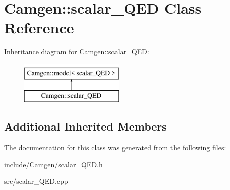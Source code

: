 \hypertarget{a00487}{\section{Camgen\-:\-:scalar\-\_\-\-Q\-E\-D Class Reference}
\label{a00487}
}
Inheritance diagram for Camgen\-:\-:scalar\-\_\-\-Q\-E\-D\-:\begin{figure}[H]
\begin{center}
\leavevmode
\includegraphics[height=2.000000cm]{a00487}
\end{center}
\end{figure}
\subsection*{Additional Inherited Members}


The documentation for this class was generated from the following files\-:\begin{DoxyCompactItemize}
\item 
include/\-Camgen/scalar\-\_\-\-Q\-E\-D.\-h\item 
src/scalar\-\_\-\-Q\-E\-D.\-cpp\end{DoxyCompactItemize}
